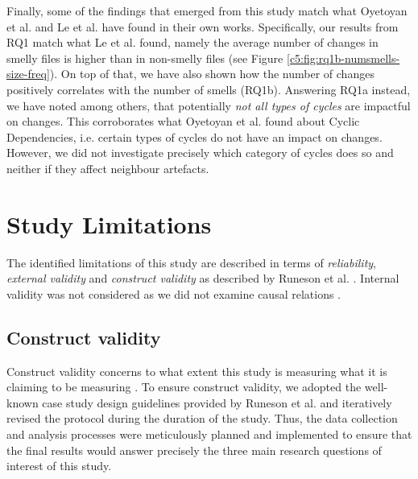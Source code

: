 Finally, some of the findings that emerged from this study match what Oyetoyan et al. \cite{Oyetoyan2015} and Le et al. \cite{Le2018} have found in their own works.
Specifically, our results from RQ1 match what Le et al. \cite{Le2018} found, namely the average number of changes in smelly files is higher than in non-smelly files (see Figure \ref{c5:fig:rq1b-numsmells-size-freq}). On top of that, we have also shown how the number of changes positively correlates with the number of smells (RQ1b).
Answering RQ1a instead, we have noted among others, that potentially \emph{not all types of cycles} are impactful on changes. This corroborates what Oyetoyan et al. \cite{Oyetoyan2015} found about Cyclic Dependencies, i.e. certain types of cycles do not have an impact on changes. However, we did not investigate precisely which category of cycles does so and neither if they affect neighbour artefacts.

\section{Study Limitations}\label{c5:sec:limitations}
The identified limitations of this study are described in terms of \emph{reliability}, \emph{external validity} and \emph{construct validity} as described by Runeson et al. \cite{Runeson2012}. Internal validity was not considered as we did not examine causal relations \cite{Runeson2012}. %

\subsection{Construct validity}
Construct validity concerns to what extent this study is measuring what it is claiming to be measuring \cite{Runeson2012}.
To ensure construct validity, we adopted the well-known case study design guidelines provided by Runeson et al. \cite{Runeson2012} and iteratively revised the protocol during the duration of the study.
Thus, the data collection and analysis processes were meticulously planned and implemented to ensure that the final results would answer precisely the three main research questions of interest of this study.

